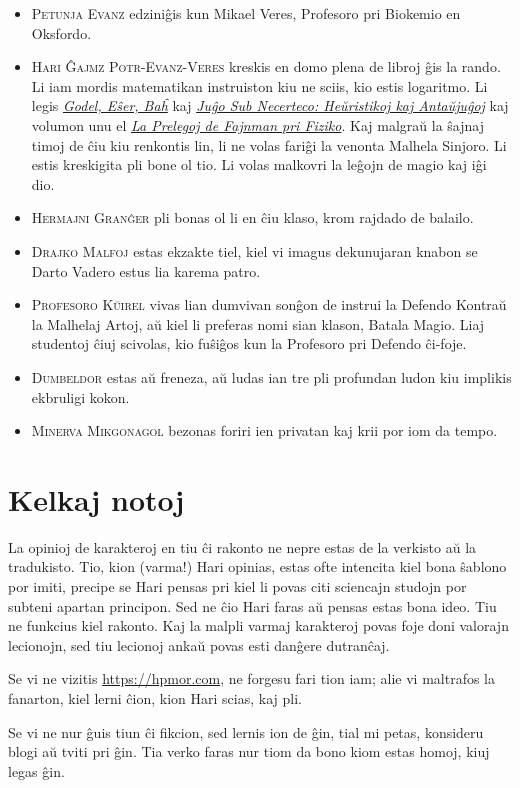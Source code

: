 \begin{itemize}
\item \textsc{Petunja Evanz} edziniĝis kun Mikael Veres, Profesoro pri Biokemio en Oksfordo.
\item \textsc{Hari Ĝajmz Potr-Evanz-Veres} kreskis en domo plena de libroj ĝis la rando.
  Li iam mordis matematikan instruiston kiu ne sciis, kio estis logaritmo.
  Li legis \href{https://books.google.com/books?vid=ISBN9780465026562}{\emph{Godel, Eŝer, Baĥ}}
  kaj \href{https://books.google.com/books?vid=ISBN9780521284141}{\emph{Juĝo Sub Necerteco: Heŭristikoj kaj Antaŭjuĝoj}}
  kaj volumon unu el \href{https://books.google.com/books?vid=ISBN9780201021158}{\emph{La Prelegoj de Fajnman pri Fiziko}}.
  Kaj malgraŭ la ŝajnaj timoj de ĉiu kiu renkontis lin, li ne volas fariĝi la venonta Malhela Sinjoro.
  Li estis kreskigita pli bone ol tio.
  Li volas malkovri la leĝojn de magio kaj iĝi dio.
\item \textsc{Hermajni Granĝer} pli bonas ol li en ĉiu klaso, krom rajdado de balailo.
\item \textsc{Drajko Malfoj} estas ekzakte tiel, kiel vi imagus dekunujaran knabon se Darto Vadero estus lia karema patro.
\item \textsc{Profesoro Kŭirel} vivas lian dumvivan sonĝon de instrui la Defendo Kontraŭ la Malhelaj Artoj, aŭ kiel li preferas nomi sian klason, Batala Magio.
  Liaj studentoj ĉiuj scivolas, kio fuŝiĝos kun la Profesoro pri Defendo ĉi-foje.
\item \textsc{Dumbeldor} estas aŭ freneza, aŭ ludas ian tre pli profundan ludon kiu implikis ekbruligi kokon.
\item \textsc{Minerva Mikgonagol} bezonas foriri ien privatan kaj krii por iom da tempo.
\end{itemize}

%
%

\section*{Kelkaj notoj}

La opinioj de karakteroj en tiu ĉi rakonto ne nepre estas de la verkisto aŭ la tradukisto.
Tio, kion (varma!) Hari opinias, estas ofte intencita kiel bona ŝablono por imiti, precipe se Hari pensas pri kiel li povas citi sciencajn studojn por subteni apartan principon.
Sed ne ĉio Hari faras aŭ pensas estas bona ideo.
Tiu ne funkcius kiel rakonto.
Kaj la malpli varmaj karakteroj povas foje doni valorajn lecionojn, sed tiu lecionoj ankaŭ povas esti danĝere dutranĉaj.

Se vi ne vizitis \url{https://hpmor.com}, ne forgesu fari tion iam; alie vi maltrafos la fanarton, kiel lerni ĉion, kion Hari scias, kaj pli.

Se vi ne nur ĝuis tiun ĉi fikcion, sed lernis ion de ĝin, tial mi petas, konsideru blogi aŭ tviti pri ĝin.
Tia verko faras nur tiom da bono kiom estas homoj, kiuj legas ĝin.

